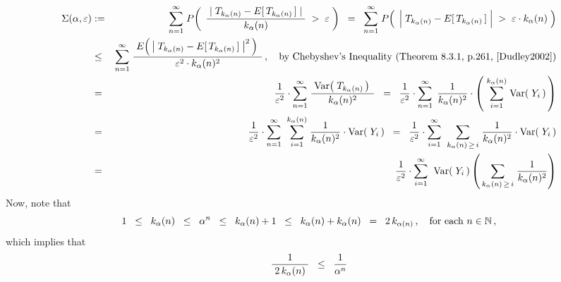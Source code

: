 \begin{enumerate}
\begin{eqnarray*}
\Sigma(\alpha,\varepsilon)
& := &
	\overset{\infty}{\underset{n=1}{\sum}}\;
	P\!\left(\;\,
		\dfrac{{\color{white}.}\vert\;T_{k_{\alpha}(n)} - E[\,T_{k_{\alpha}(n)}\,]\;\vert{\color{white}.}}{k_{\alpha}(n)}
		\;>\;\varepsilon
		\;\right)
	\;\; = \;\;
	\overset{\infty}{\underset{n=1}{\sum}}\;
	P\!\left(\;\,
		\left\vert\;T_{k_{\alpha}(n)} \overset{{\color{white}.}}{-} E[\,T_{k_{\alpha}(n)}\,]\;\right\vert
		\;>\;\varepsilon \cdot k_{\alpha}(n)
		\;\right)
\\
& \leq &
	\overset{\infty}{\underset{n=1}{\sum}}\;
	\dfrac{
		{\color{white}.}E\!\left(\,\left\vert\;T_{k_{\alpha}(n)} - E[\,T_{k_{\alpha}(n)}\,]\;\right\vert^{2}\,\right){\color{white}.}
		}{
		\varepsilon^{2} \cdot k_{\alpha}(n)^{2}
		}\,,
	\quad\textnormal{by Chebyshev's Inequality (Theorem 8.3.1, p.261, \cite{Dudley2002})}
\\
& = &
	\dfrac{1}{\varepsilon^{2}} \cdot
	\overset{\infty}{\underset{n=1}{\sum}}\;
	\dfrac{
		{\color{white}.}\Var\!\left(\;T_{k_{\alpha}(n)}\,\right){\color{white}.}
		}{
		k_{\alpha}(n)^{2}
		}
	\;\; = \;\;
	\dfrac{1}{\varepsilon^{2}} \cdot
	\overset{\infty}{\underset{n=1}{\sum}}\;\,
	\dfrac{1}{k_{\alpha}(n)^{2}} \cdot
	\left(\;\overset{k_{\alpha}(n)}{\underset{i=1}{\sum}}\;\Var\!\left(\;Y_{i}\,\right)\,\right)
\\
& = &
	\dfrac{1}{\varepsilon^{2}} \cdot
	\overset{\infty}{\underset{n=1}{\sum}}\;\;
	\overset{k_{\alpha}(n)}{\underset{i=1}{\sum}}\;
		\dfrac{1}{k_{\alpha}(n)^{2}} \cdot \Var\!\left(\;Y_{i}\,\right)
	\;\; = \;\;
	\dfrac{1}{\varepsilon^{2}} \cdot
	\overset{\infty}{\underset{i=1}{\sum}}\;\;
	\underset{k_{\alpha}(n)\,\geq\,i}{\sum}\;
		\dfrac{1}{k_{\alpha}(n)^{2}} \cdot \Var\!\left(\;Y_{i}\,\right)
\\
& = &
	\dfrac{1}{\varepsilon^{2}} \cdot
	\overset{\infty}{\underset{i=1}{\sum}}\;\;
	\Var\!\left(\;Y_{i}\,\right)
		\left(\,
			\underset{k_{\alpha}(n)\,\geq\,i}{\sum}\;
			\dfrac{1}{k_{\alpha}(n)^{2}}
			\right)
\end{eqnarray*}
Now, note that
\begin{equation*}
1 \;\;\leq\;\; k_{\alpha}(n) \;\;\leq\;\; \alpha^{n} \;\;\leq\;\; k_{\alpha}(n) + 1
\;\;\leq\;\; k_{\alpha}(n) + k_{\alpha}(n) \;\;=\;\; 2\,k_{\alpha(n)}\,,
\quad
\textnormal{for each $n \in \mathbb{N}$}\,,
\end{equation*}
which implies that
\begin{equation*}
\dfrac{1}{{\color{white}.}2\,k_{\alpha}(n){\color{white}.}} \;\;\leq\;\; \dfrac{1}{\alpha^{n}}

\end{equation*}
\end{enumerate}
